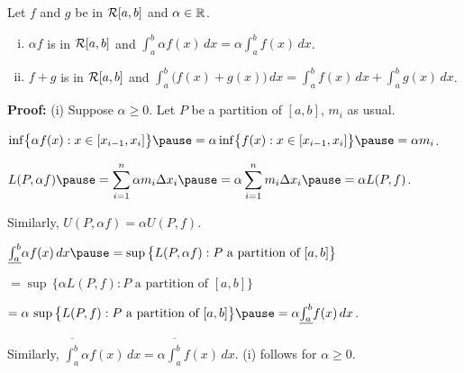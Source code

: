 \documentclass[10pt,aspectratio=149]{beamer}
\begin{document}
\begin{frame}

\begin{proposition}[Linearity]
Let $f$ and $g$ be in ${\mathcal{R}}[a,b]$ and $\alpha \in {\mathbb{R}}$.
\begin{enumerate}[(i)]
\item
\pause
$\alpha f$ is in ${\mathcal{R}}[a,b]$ and
$\int_a^b \alpha f(x) \,dx = \alpha \int_a^b f(x) \,dx$.
\item
\pause
$f+g$ is in ${\mathcal{R}}[a,b]$ and
$\int_a^b \bigl( f(x)+g(x) \bigr) \,dx = 
\int_a^b f(x) \,dx 
+
\int_a^b g(x) \,dx$.
\end{enumerate}
\end{proposition}

\pause
\textbf{Proof:}
(i) Suppose $\alpha \geq 0$.
\pause
\quad
Let $P$ be a partition of $[a,b]$, \quad $m_i$ as usual.


\pause
$\inf \bigl\{ \alpha f(x) : x \in [x_{i-1},x_i] \bigr\}
\pause
=
\alpha \inf \bigl\{ f(x) : x \in [x_{i-1},x_i] \bigr\}
\pause
= \alpha m_i$.

\pause
\medskip

$\displaystyle
L(P,\alpha f)
\pause
=
\sum_{i=1}^n \alpha m_i \Delta x_i
\pause
=
\alpha \sum_{i=1}^n m_i \Delta x_i
\pause
=
\alpha L(P,f)$.

\pause
\medskip

Similarly,
$U(P,\alpha f) = \alpha U(P,f)$.

\pause
\medskip

$%
\underline{\int_a^b} \alpha f(x)\,dx
\pause
=
\sup \, \bigl\{ L(P,\alpha f) : P \text{ a partition of } [a,b] \bigr\}
$

\pause
\qquad
$
=
\sup \, \bigl\{ \alpha L(P,f) : P \text{ a partition of } [a,b] \bigr\}
$

\pause
\qquad
$
=
\alpha \,
\sup \, \bigl\{ L(P,f) : P \text{ a partition of } [a,b] \bigr\}
\pause
=
\alpha
\underline{\int_a^b} f(x)\,dx
$.

\pause
Similarly,
$
\overline{\int_a^b} \alpha f(x)\,dx
=
\alpha
\overline{\int_a^b} f(x)\,dx$.
\pause
\wthus
(i) follows for $\alpha \geq 0$.

\end{frame}
\end{document}
